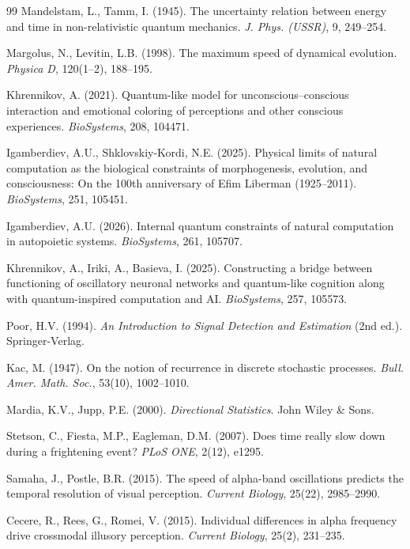 \documentclass[12pt]{article}
\begin{document}
\begin{thebibliography}{99}
Mandelstam, L., Tamm, I. (1945). The uncertainty relation between energy and time in non-relativistic quantum mechanics. \textit{J. Phys. (USSR)}, 9, 249--254.

Margolus, N., Levitin, L.B. (1998). The maximum speed of dynamical evolution. \textit{Physica D}, 120(1--2), 188--195.

Khrennikov, A. (2021). Quantum-like model for unconscious--conscious interaction and emotional coloring of perceptions and other conscious experiences. \textit{BioSystems}, 208, 104471.

Igamberdiev, A.U., Shklovskiy-Kordi, N.E. (2025). Physical limits of natural computation as the biological constraints of morphogenesis, evolution, and consciousness: On the 100th anniversary of Efim Liberman (1925--2011). \textit{BioSystems}, 251, 105451.

Igamberdiev, A.U. (2026). Internal quantum constraints of natural computation in autopoietic systems. \textit{BioSystems}, 261, 105707.

Khrennikov, A., Iriki, A., Basieva, I. (2025). Constructing a bridge between functioning of oscillatory neuronal networks and quantum-like cognition along with quantum-inspired computation and AI. \textit{BioSystems}, 257, 105573.

Poor, H.V. (1994). \textit{An Introduction to Signal Detection and Estimation} (2nd ed.). Springer-Verlag.

Kac, M. (1947). On the notion of recurrence in discrete stochastic processes. \textit{Bull. Amer. Math. Soc.}, 53(10), 1002--1010.

Mardia, K.V., Jupp, P.E. (2000). \textit{Directional Statistics}. John Wiley \& Sons.

Stetson, C., Fiesta, M.P., Eagleman, D.M. (2007). Does time really slow down during a frightening event? \textit{PLoS ONE}, 2(12), e1295.

Samaha, J., Postle, B.R. (2015). The speed of alpha-band oscillations predicts the temporal resolution of visual perception. \textit{Current Biology}, 25(22), 2985--2990.

Cecere, R., Rees, G., Romei, V. (2015). Individual differences in alpha frequency drive crossmodal illusory perception. \textit{Current Biology}, 25(2), 231--235.


\end{thebibliography}
\end{document}
